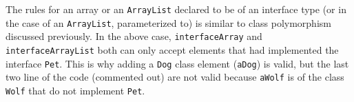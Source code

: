 \documentclass{tufte-handout}
\begin{document}
    The rules for an array or an \texttt{ArrayList} declared to be of an interface type (or in the case of an \texttt{ArrayList}, parameterized to) is similar to class polymorphism discussed previously. In the above case, \texttt{interfaceArray} and \texttt{interfaceArrayList} both can only accept elements that had implemented the interface \texttt{Pet}. This is why adding a \texttt{Dog} class element (\texttt{aDog}) is valid, but the last two line of the code (commented out) are not valid because \texttt{aWolf} is of the class \texttt{Wolf} that do not implement \texttt{Pet}.
\end{document}
